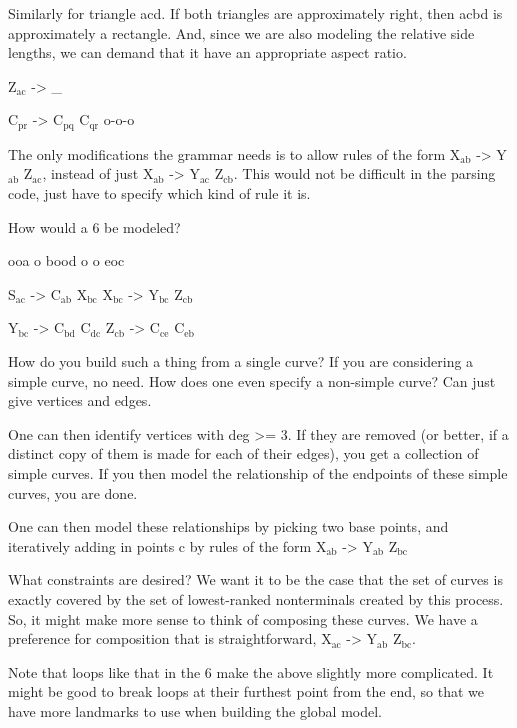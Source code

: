 \documentclass{book}
\begin{document}
Similarly for triangle acd. If both triangles are approximately right,
then acbd is approximately a rectangle. And, since we are also
modeling the relative side lengths, we can demand that it have an
appropriate aspect ratio.

Z$_{\mathrm{ac}}$ -> \_{}

C$_{\mathrm{pr}}$ -> C$_{\mathrm{pq}}$ C$_{\mathrm{qr}}$
o-o-o

The only modifications the grammar needs is to allow rules of the form
X$_{\mathrm{ab}}$ -> Y$_{\mathrm{ab}}$ Z$_{\mathrm{ac}}$, instead of just X$_{\mathrm{ab}}$ -> Y$_{\mathrm{ac}}$ Z$_{\mathrm{cb}}$. This would not
be difficult in the parsing code, just have to specify which kind of
rule it is.

How would a 6 be modeled?

  ooa
 o   
 bood
 o   o
  eoc

S$_{\mathrm{ac}}$ -> C$_{\mathrm{ab}}$ X$_{\mathrm{bc}}$
X$_{\mathrm{bc}}$ -> Y$_{\mathrm{bc}}$ Z$_{\mathrm{cb}}$

Y$_{\mathrm{bc}}$ -> C$_{\mathrm{bd}}$ C$_{\mathrm{dc}}$
Z$_{\mathrm{cb}}$ -> C$_{\mathrm{ce}}$ C$_{\mathrm{eb}}$

How do you build such a thing from a single curve? If you are
considering a simple curve, no need. How does one even specify a
non-simple curve? Can just give vertices and edges.

One can then identify vertices with deg >= 3. If they are removed (or
better, if a distinct copy of them is made for each of their edges),
you get a collection of simple curves. If you then model the
relationship of the endpoints of these simple curves, you are done. 

One can then model these relationships by picking two base points, and
iteratively adding in points c by rules of the form 
X$_{\mathrm{ab}}$ -> Y$_{\mathrm{ab}}$ Z$_{\mathrm{bc}}$

What constraints are desired? We want it to be the case that the set
of curves is exactly covered by the set of lowest-ranked nonterminals
created by this process. So, it might make more sense to think of
composing these curves. We have a preference for composition that is
straightforward, X$_{\mathrm{ac}}$ -> Y$_{\mathrm{ab}}$ Z$_{\mathrm{bc}}$. 

Note that loops like that in the 6 make the above slightly more
complicated. It might be good to break loops at their furthest point
from the end, so that we have more landmarks to use when building the
global model.
\end{document}

